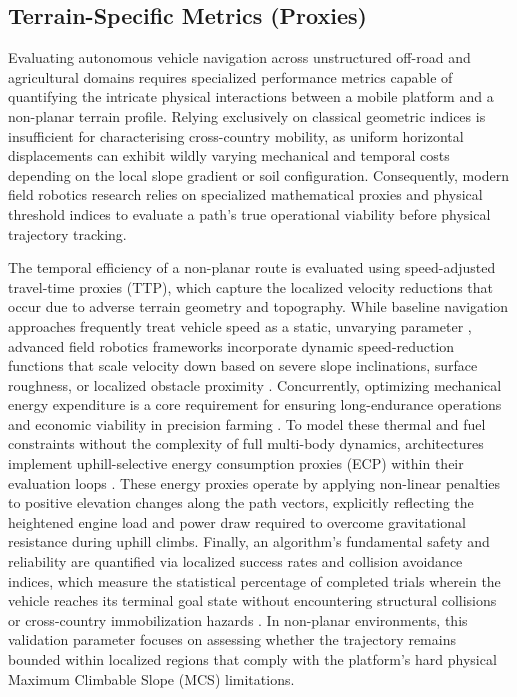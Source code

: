 \subsection{Terrain-Specific Metrics (Proxies)}

Evaluating autonomous vehicle navigation across unstructured off-road and agricultural domains
requires specialized performance metrics capable of quantifying the intricate physical interactions
between a mobile platform and a non-planar terrain profile. Relying exclusively on classical
geometric indices is insufficient for characterising cross-country mobility, as uniform horizontal
displacements can exhibit wildly varying mechanical and temporal costs depending on the local slope
gradient or soil configuration. Consequently, modern field robotics research relies on specialized
mathematical proxies and physical threshold indices to evaluate a path's true operational viability
before physical trajectory tracking.

The temporal efficiency of a non-planar route is evaluated using speed-adjusted travel-time proxies
(TTP), which capture the localized velocity reductions that occur due to adverse terrain geometry
and topography. While baseline navigation approaches frequently treat vehicle speed as a static,
unvarying parameter \citep{Cheng_2014_improvedhierarchical}, advanced field robotics frameworks incorporate dynamic
speed-reduction functions that scale velocity down based on severe slope inclinations, surface
roughness, or localized obstacle proximity \citep{Wang_2015_pathplanning}. Concurrently, optimizing mechanical
energy expenditure is a core requirement for ensuring long-endurance operations and economic
viability in precision farming \citep{Hameed_2021_comprehensivereview}. To model these thermal and fuel constraints without
the complexity of full multi-body dynamics, architectures implement uphill-selective energy
consumption proxies (ECP) within their evaluation loops \citep{Ducho_2014_pathplanning}. These energy proxies operate
by applying non-linear penalties to positive elevation changes along the path vectors, explicitly
reflecting the heightened engine load and power draw required to overcome gravitational resistance
during uphill climbs. Finally, an algorithm's fundamental safety and reliability are quantified via
localized success rates and collision avoidance indices, which measure the statistical percentage of
completed trials wherein the vehicle reaches its terminal goal state without encountering structural
collisions or cross-country immobilization hazards \citep{Liu_2023_autonomousnavigation, Lee_2023_learningbaseduncertaintyaware, Nazarahari_2019_multiobjectivemultirobot}. In non-planar
environments, this validation parameter focuses on assessing whether the trajectory remains bounded
within localized regions that comply with the platform's hard physical Maximum Climbable Slope (MCS)
limitations.

